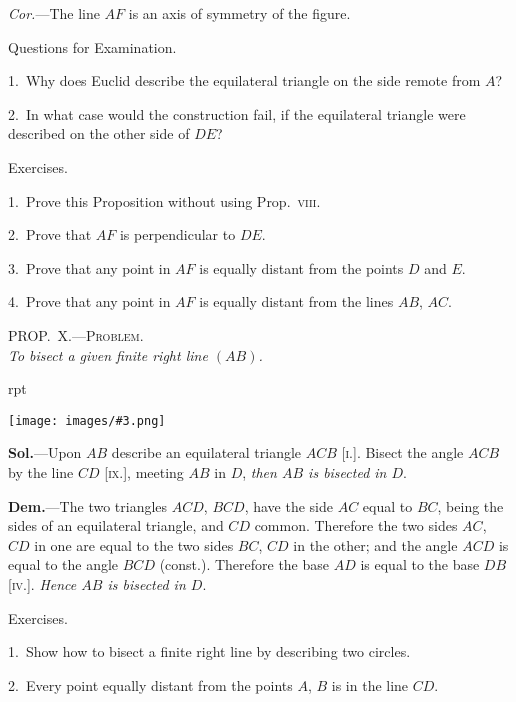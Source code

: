 \documentclass[oneside]{book}
\newcounter{wrapwidth}
\newcommand\myprop[2]{
\bigskip\Needspace*{4\baselineskip}\begin{center}\textsc{#1}\\\medskip\emph{#2}\par\end{center}
}
\newcommand\exhead[1]{
\Needspace*{5\baselineskip}\begin{center}
\textsf{#1}
\end{center}
}
\newcommand\imgflow[3]{
\setcounter{wrapwidth}{#1}
\begin{wrapfigure}[#2]{r}{\value{wrapwidth}pt}
\begin{center}
\vspace{-0.3in}
\texttt{[image: images/\#3.png]}
\end{center}
\end{wrapfigure}
}
\begin{document}
\emph{Cor.}---The line $AF$ is an axis of symmetry of the
figure.

\exhead{Questions for Examination.}

\begin{footnotesize}
1.~Why does Euclid describe the equilateral triangle on the
side remote from $A$?

2.~In what case would the construction fail, if the equilateral
triangle were described on the other side of $DE$?
\par\end{footnotesize}

\exhead{Exercises.}

\begin{footnotesize}
1.~Prove this Proposition without using Prop.~\textsc{viii.}

2.~Prove that $AF$ is perpendicular to $DE$.

3.~Prove that any point in $AF$ is equally distant from the
points $D$ and $E$.

4.~Prove that any point in $AF$ is equally distant from the lines
$AB$, $AC$.
\par\end{footnotesize}



\myprop{PROP\@.~X.---Problem.}{To bisect a given finite right line $(AB)$.}

\imgflow{100}{9}{f025}

\textbf{Sol.}---Upon $AB$ describe an equilateral triangle $ACB$
[\textsc{i.}]. %
Bisect the angle $ACB$ by the
line $CD$ [\textsc{ix.}], meeting $AB$ in $D$, \emph{then
$AB$ is bisected in $D$}.

\textbf{Dem.}---The two triangles $ACD$,
$BCD$, have the side $AC$ equal to $BC$,
being the sides of an equilateral
triangle, and $CD$ common. Therefore
the two sides $AC$, $CD$ in one
are equal to the two sides $BC$, $CD$ in the other; and the
angle $ACD$ is equal to the angle $BCD$ (const.). Therefore
the base $AD$ is equal to the base $DB$ [\textsc{iv.}]. \emph{Hence
$AB$ is bisected in $D$}.

\exhead{Exercises.}

\begin{footnotesize}
1.~Show how to bisect a finite right line by describing two
circles.

2.~Every point equally distant from the points $A$, $B$ is in the
line $CD$.
\par\end{footnotesize}
\end{document}
